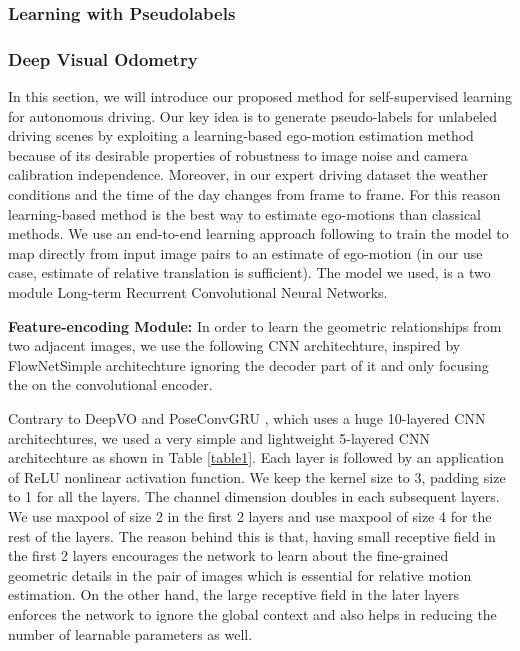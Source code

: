 \documentclass[letterpaper, 12pt]{article}
\theoremstyle{definition}
\theoremstyle{definition}
\theoremstyle{definition}
\theoremstyle{definition}
\theoremstyle{definition}
\begin{document}
\subsubsection{Learning with Pseudolabels}
\label{sec:orgfa68275}
\subsubsection{Deep Visual Odometry}
\label{sec:org55d7f3f}
In this section, we will introduce our proposed method for self-supervised
learning for autonomous driving. Our key idea is to generate pseudo-labels for
unlabeled driving scenes by exploiting a learning-based ego-motion estimation
method because of its desirable properties of robustness to image noise and
camera calibration independence. Moreover, in our expert driving dataset the
weather conditions and the time of the day changes from frame to frame. For this
reason learning-based method is the best way to estimate ego-motions than
classical methods. We use an end-to-end learning approach following
\cite{Wang2017, Zhai2019} to train the model to map directly from input image
pairs to an estimate of ego-motion (in our use case, estimate of relative
translation is sufficient). The model we used, is a two module Long-term
Recurrent Convolutional Neural Networks.

\textbf{Feature-encoding Module:} In order to learn the geometric relationships from
two adjacent images, we use the following CNN architechture, inspired by
FlowNetSimple architechture \cite{Fischer2015} ignoring the decoder part of it
and only focusing the on the convolutional encoder.



Contrary to DeepVO \cite{Wang2017} and PoseConvGRU \cite{Zhai2019}, which uses a
huge 10-layered CNN architechtures, we used a very simple and lightweight
5-layered CNN architechture as shown in Table \ref{table1}. Each layer is
followed by an application of ReLU nonlinear activation function. We keep the
kernel size to 3, padding size to 1 for all the layers. The channel dimension
doubles in each subsequent layers. We use maxpool of size 2 in the first 2
layers and use maxpool of size 4 for the rest of the layers. The reason behind
this is that, having small receptive field in the first 2 layers encourages the
network to learn about the fine-grained geometric details in the pair of images
which is essential for relative motion estimation. On the other hand, the large
receptive field in the later layers enforces the network to ignore the global
context and also helps in reducing the number of learnable parameters as well.
\end{document}
